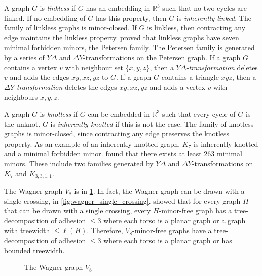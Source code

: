 A graph $G$ is \textit{linkless} if $G$ has an embedding in $\mathbb{R}^3$ such that no two cycles are linked. If no embedding of $G$ has this property, then $G$ is \textit{inherently linked}. The family of linkless graphs is minor-closed. If $G$ is linkless, then contracting any edge maintains the linkless property. \textcite{robertsonSachsLinklessEmbedding1995} proved that linkless graphs have seven minimal forbidden minors, the Petersen family. The Petersen family is generated by a series of $Y \Delta$ and $\Delta Y$-transformations on the Petersen graph. If a graph $G$ contains a vertex $v$ with neighbour set $\{x,y,z\}$, then a \textit{$Y \Delta$-transformation} deletes $v$ and adds the edges $xy,xz, yz$ to $G$. If a graph $G$ contains a triangle $xyz$, then a \textit{$\Delta Y$-transformation} deletes the edges $xy, xz, yz$ and adds a vertex $v$ with neighbours $x, y, z$. 

A graph $G$ is \textit{knotless} if $G$ can be embedded in $\mathbb{R}^3$ such that every cycle of $G$ is the unknot. $G$ is \textit{inherently knotted} if this is not the case. The family of knotless graphs is minor-closed, since contracting any edge preserves the knotless property. As an example of an inherently knotted graph, $K_7$ is inherently knotted and a minimal forbidden minor. \textcite{goldbergManyManyMore2014} found that there exists at least 263 minimal minors. These include two families generated by $Y \Delta$ and $\Delta Y$-transformations on $K_7$ and $K_{3,3,1,1}$. 



The Wagner graph $V_8$ is in \cref{fig:wagner}. In fact, the Wagner graph can be drawn with a single crossing, in \cref{fig:wagner_single_crossing}. \textcite{robertsonExcludingGraphOne1993} showed that for every graph $H$ that can be drawn with a single crossing, every $H$-minor-free graph has a tree-decomposition of adhesion $\leq 3$ where each torso is a planar graph or a graph with treewidth $\leq \ell(H)$. Therefore, $V_8$-minor-free graphs have a tree-decomposition of adhesion $\leq 3$ where each torso is a planar graph or has bounded treewidth. 
\begin{figure}[h!]
	\centering
	\begin{tikzpicture}[thick,scale=1.5, every node/.style={scale=2}]
		
	\end{tikzpicture}
	\caption[Wagner graph]{The Wagner graph $V_8$}\label{fig:wagner}
\end{figure}